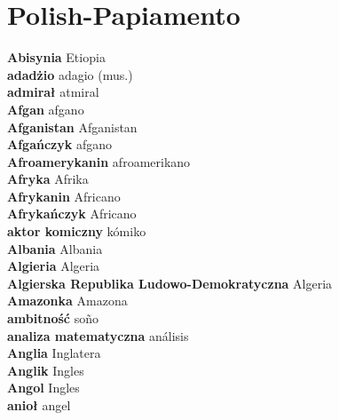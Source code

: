\twocolumn
\chapter{Polish-Papiamento}
\small
{}\textbf{ Abisynia  } Etiopia \\
\textbf{ adadżio  } adagio (mus.) \\
\textbf{ admirał  } atmiral \\
\textbf{ Afgan  } afgano \\
\textbf{ Afganistan  } Afganistan \\
\textbf{ Afgańczyk  } afgano \\
\textbf{ Afroamerykanin  } afroamerikano \\
\textbf{ Afryka  } Afrika \\
\textbf{ Afrykanin  } Africano \\
\textbf{ Afrykańczyk  } Africano \\
\textbf{ aktor komiczny  } kómiko \\
\textbf{ Albania  } Albania \\
\textbf{ Algieria  } Algeria \\
\textbf{ Algierska Republika Ludowo-Demokratyczna  } Algeria \\
\textbf{ Amazonka  } Amazona \\
\textbf{ ambitność  } soño \\
\textbf{ analiza matematyczna  } análisis \\
\textbf{ Anglia  } Inglatera \\
\textbf{ Anglik  } Ingles \\
\textbf{ Angol  } Ingles \\
\textbf{ anioł  } angel \\
